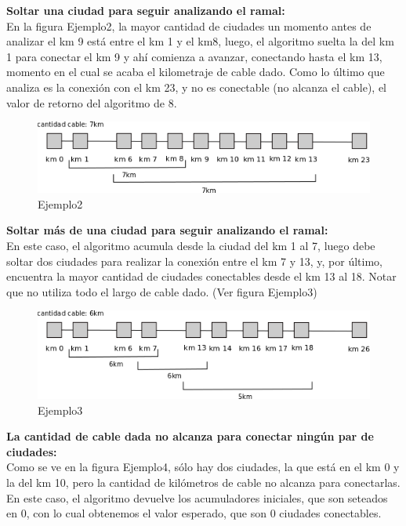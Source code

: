 \documentclass[spanish,a4paper]{article}
\begin{document}
\textbf{Soltar una ciudad para seguir analizando el ramal:} \\

En la figura Ejemplo2, la mayor cantidad de ciudades un momento antes de analizar el km 9 está entre el km 1 y el km8, luego, el algoritmo suelta la del km 1 para conectar el km 9 y ahí comienza a avanzar, conectando hasta el km 13, momento en el cual se acaba el kilometraje de cable dado. Como lo último que analiza es la conexión con el km 23, y no es conectable (no alcanza el cable), el valor de retorno del algoritmo de 8.

\begin{figure}[h]
\centering
\includegraphics[scale = 0.7]{caso2}
\caption{Ejemplo2}
\label{Ejemplo2}
\end{figure}

\textbf{Soltar más de una ciudad para seguir analizando el ramal:} \\

En este caso, el algoritmo acumula desde la ciudad del km 1 al 7, luego debe soltar dos ciudades para realizar la conexión entre el km 7 y 13, y, por último, encuentra la mayor cantidad de ciudades conectables desde el km 13 al 18. Notar que no utiliza todo el largo de cable dado. (Ver figura Ejemplo3) 

\begin{figure}[h]
\centering
\includegraphics[scale = 0.7]{caso3}
\caption{Ejemplo3}
\label{Ejemplo3}
\end{figure}

\newpage
\textbf{La cantidad de cable dada no alcanza para conectar ningún par de ciudades:} \\

Como se ve en la figura Ejemplo4, sólo hay dos ciudades, la que está en el km 0 y la del km 10, pero la cantidad de kilómetros de cable no alcanza para conectarlas. En este caso, el algoritmo devuelve los acumuladores iniciales, que son seteados en 0, con lo cual obtenemos el valor esperado, que son 0 ciudades conectables.
\end{document}
